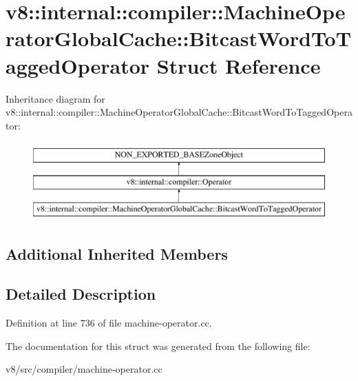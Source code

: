 \hypertarget{structv8_1_1internal_1_1compiler_1_1MachineOperatorGlobalCache_1_1BitcastWordToTaggedOperator}{}\section{v8\+:\+:internal\+:\+:compiler\+:\+:Machine\+Operator\+Global\+Cache\+:\+:Bitcast\+Word\+To\+Tagged\+Operator Struct Reference}
\label{structv8_1_1internal_1_1compiler_1_1MachineOperatorGlobalCache_1_1BitcastWordToTaggedOperator}
Inheritance diagram for v8\+:\+:internal\+:\+:compiler\+:\+:Machine\+Operator\+Global\+Cache\+:\+:Bitcast\+Word\+To\+Tagged\+Operator\+:\begin{figure}[H]
\begin{center}
\leavevmode
\includegraphics[height=3.000000cm]{structv8_1_1internal_1_1compiler_1_1MachineOperatorGlobalCache_1_1BitcastWordToTaggedOperator}
\end{center}
\end{figure}
\subsection*{Additional Inherited Members}


\subsection{Detailed Description}


Definition at line 736 of file machine-\/operator.\+cc.



The documentation for this struct was generated from the following file\+:\begin{DoxyCompactItemize}
\item 
v8/src/compiler/machine-\/operator.\+cc\end{DoxyCompactItemize}
